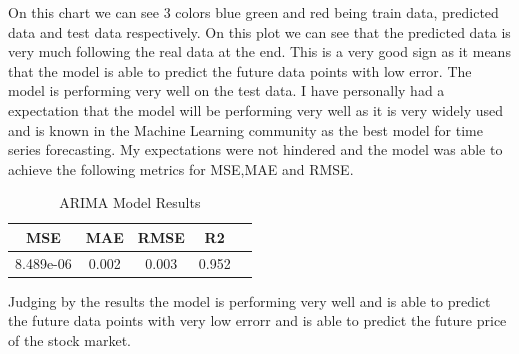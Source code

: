 \documentclass{imc-inf}
\begin{document}
	On this chart we can see 3 colors blue green and red being train data, predicted data and test data respectively. On this plot we can see that the predicted data is very much following  
	the real data at the end. This is a very good sign as it means that the model is able to predict the future data points with low error. The model is performing very well on the test data. 
	I have personally had a expectation that the model will be performing very well as it is very widely used and is known in the Machine Learning community as the best model for time series forecasting.
	My expectations were not hindered and the model was able to achieve the following metrics for MSE,MAE and RMSE.
	\begin{table}[h!]
		\centering
		\begin{tabular}{|c|c|c|c|c|}
			\hline
			\textbf{MSE} & \textbf{MAE} & \textbf{RMSE}  & \textbf{R2}\\ \hline
			8.489e-06 & 0.002 & 0.003 & 0.952\\ \hline
		\end{tabular}
		\caption{ARIMA Model Results}
		\label{tab:arima_model_results}
	\end{table}
	
	Judging by the results the model is performing very well and is able to predict the future data points with very low errorr and is able to predict the future price of the stock market.
	
	
	
\end{document}
